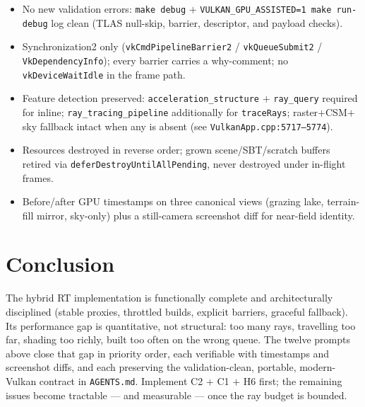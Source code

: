 \documentclass[11pt,a4paper]{article}
\begin{document}
\begin{itemize}
    \item No new validation errors: \texttt{make debug} $+$ \texttt{VULKAN\_GPU\_ASSISTED=1 make run-debug} log clean (TLAS null-skip, barrier, descriptor, and payload checks).
    \item Synchronization2 only (\texttt{vkCmdPipelineBarrier2} / \texttt{vkQueueSubmit2} / \texttt{VkDependencyInfo}); every barrier carries a why-comment; no \texttt{vkDeviceWaitIdle} in the frame path.
    \item Feature detection preserved: \texttt{acceleration\_structure} $+$ \texttt{ray\_query} required for inline; \texttt{ray\_tracing\_pipeline} additionally for \texttt{traceRays}; raster$+$CSM$+$sky fallback intact when any is absent (see \texttt{VulkanApp.cpp:5717--5774}).
    \item Resources destroyed in reverse order; grown scene/SBT/scratch buffers retired via \texttt{deferDestroyUntilAllPending}, never destroyed under in-flight frames.
    \item Before/after GPU timestamps on three canonical views (grazing lake, terrain-fill mirror, sky-only) plus a still-camera screenshot diff for near-field identity.
\end{itemize}

\section{Conclusion}

The hybrid RT implementation is functionally complete and architecturally disciplined (stable proxies, throttled builds, explicit barriers, graceful fallback). Its performance gap is quantitative, not structural: too many rays, travelling too far, shading too richly, built too often on the wrong queue. The twelve prompts above close that gap in priority order, each verifiable with timestamps and screenshot diffs, and each preserving the validation-clean, portable, modern-Vulkan contract in \texttt{AGENTS.md}. Implement C2 $+$ C1 $+$ H6 first; the remaining issues become tractable --- and measurable --- once the ray budget is bounded.
\end{document}
